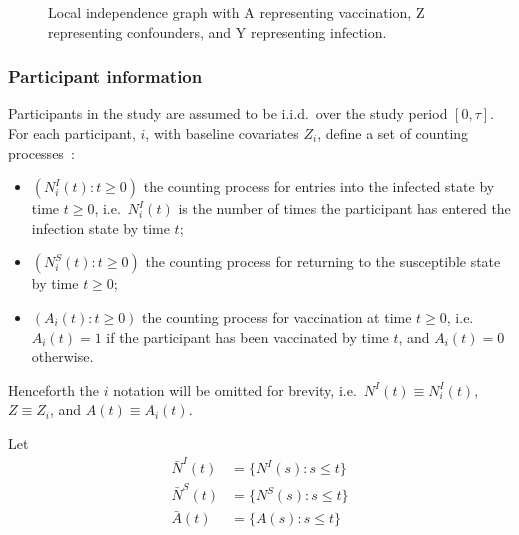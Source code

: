 \begin{figure}[htbp!]
    \centering
    \caption[Local independence graph with A representing vaccination, Z representing confounders, and Y representing infection]{Local independence graph with A representing vaccination, Z representing confounders, and Y representing infection.}\label{fig:siren-local-independence-graph}
\end{figure}

\subsubsection{Participant information}

Participants in the study are assumed to be i.i.d.\ over the study period $[0, \tau]$. For each participant, $i$, with baseline covariates $Z_i$, define a set of counting processes~\parencite{Aalen2008-rf}:
%
\begin{itemize}
    \item $\left(N_i^I(t) : t \geq 0\right)$ the counting process for entries into the infected state by time $t \geq 0$, i.e.\ $N_i^I(t)$ is the number of times the participant has entered the infection state by time $t$;
    \item $\left(N_i^S(t) : t \geq 0 \right)$ the counting process for returning to the susceptible state by time $t \geq 0$;
    \item $\left(A_i(t) : t \geq 0 \right)$ the counting process for vaccination at time $t \geq 0$, i.e.\ $A_i(t) = 1$ if the participant has been vaccinated by time $t$, and $A_i(t) = 0$ otherwise.
\end{itemize}

Henceforth the $i$ notation will be omitted for brevity, i.e.\ $N^I(t) \equiv N_i^I(t)$, $Z \equiv Z_i$, and $A(t) \equiv A_i(t)$.

Let
%
\begin{align*}
    \bar{N}^I(t) & = \{N^I(s): s \leq t \} \\
    \bar{N}^S(t) & = \{N^S(s): s \leq t \} \\
    \bar{A}(t)   & = \{A(s): s \leq t \}
\end{align*}

